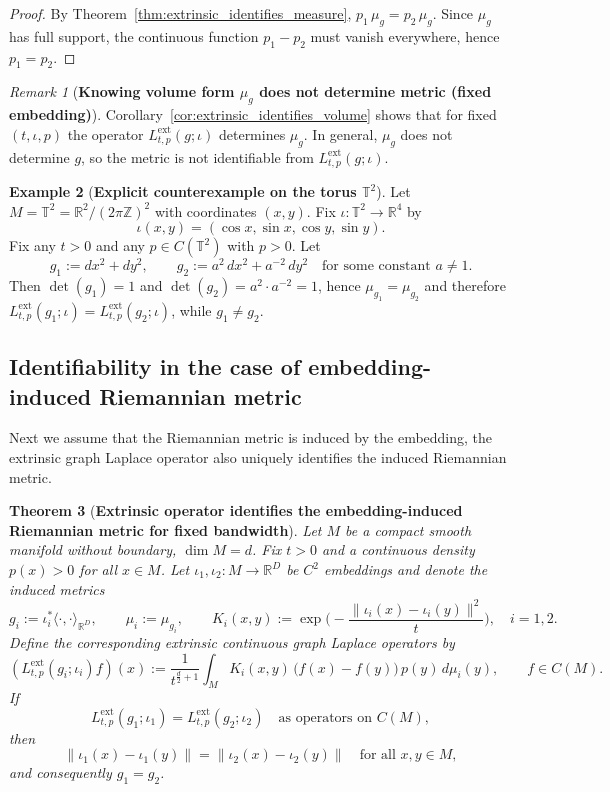 \documentclass{amsart}
\newtheorem{theorem}{Theorem}[section]
\theoremstyle{definition}
\newtheorem{example}[theorem]{Example}
\theoremstyle{remark}
\newtheorem{remark}[theorem]{Remark}
\newcommand{\nd}{\noindent}
\newcommand{\Ddim}{\mathbb{R}^D}
\newcommand{\0}{\boldsymbol{0}}
\begin{document}
\begin{proof}
By Theorem~\ref{thm:extrinsic_identifies_measure}, $p_1\,\mu_g=p_2\,\mu_g$.
Since $\mu_g$ has full support, the continuous function $p_1-p_2$ must vanish everywhere, hence $p_1=p_2$.
\end{proof}


\begin{remark}[\textbf{Knowing volume form $\mu_g$ does not determine metric (fixed embedding)}]
\label{rem:extrinsic_metric_not_identifiable}
Corollary~\ref{cor:extrinsic_identifies_volume} shows that for fixed $(t,\iota,p)$ the operator
$L^{\mathrm{ext}}_{t,p}(g;\iota)$ determines $\mu_g$. In general, $\mu_g$ does not determine $g$,
so the metric is not identifiable from $L^{\mathrm{ext}}_{t,p}(g;\iota)$.
\end{remark}

\begin{example}[\textbf{Explicit counterexample on the torus $\mathbb{T}^2$}]
\label{ex:torus_volume_same_metric_diff}
Let $M=\mathbb{T}^2=\mathbb{R}^2/(2\pi\mathbb{Z})^2$ with coordinates $(x,y)$.
Fix $\iota:\mathbb{T}^2\to\mathbb{R}^4$ by
\[
\iota(x,y)=(\cos x,\sin x,\cos y,\sin y).
\]
Fix any $t>0$ and any $p\in C(\mathbb{T}^2)$ with $p>0$.
Let
\[
g_1:=dx^2+dy^2,
\qquad
g_2:=a^2\,dx^2+a^{-2}\,dy^2\quad\text{for some constant }a\neq 1.
\]
Then $\det(g_1)=1$ and $\det(g_2)=a^2\cdot a^{-2}=1$, hence $\mu_{g_1}=\mu_{g_2}$ and therefore
$L^{\mathrm{ext}}_{t,p}(g_1;\iota)=L^{\mathrm{ext}}_{t,p}(g_2;\iota)$, while $g_1\neq g_2$.
\end{example}

\subsection{Identifiability in the case of embedding-induced Riemannian metric}
\nd Next we assume that the Riemannian metric is induced by the embedding, the extrinsic graph Laplace operator also uniquely identifies the induced Riemannian metric. 
\begin{theorem}[\textbf{Extrinsic operator identifies the embedding-induced Riemannian metric for fixed bandwidth}]
\label{thm:extrinsic_induced_metric_identifiable}
Let $M$ be a compact smooth manifold without boundary, $\dim M=d$.
Fix $t>0$ and a continuous density $p(x)>0$ for all $x\in M$.
Let $\iota_1,\iota_2:M\to {\Ddim}$ be $C^2$ embeddings and denote the induced metrics
\[
g_i:=\iota_i^*\langle\cdot,\cdot\rangle_{{\Ddim}},
\qquad \mu_i:=\mu_{g_i},
\qquad 
K_i(x,y):=\exp\!\Big(-\frac{\|\iota_i(x)-\iota_i(y)\|^2}{t}\Big),
\quad i=1,2.
\]
Define the corresponding extrinsic continuous graph Laplace operators by
\[
(L^{\mathrm{ext}}_{t,p}(g_i;\iota_i)f)(x)
:=\frac{1}{t^{\frac d2+1}}
\int_M K_i(x,y)\,\bigl(f(x)-f(y)\bigr)\,p(y)\,d\mu_i(y),
\qquad f\in C(M).
\]
If
\[
L^{\mathrm{ext}}_{t,p}(g_1;\iota_1)=L^{\mathrm{ext}}_{t,p}(g_2;\iota_2)
\quad\text{as operators on }C(M),
\]
then
\[
\|\iota_1(x)-\iota_1(y)\|
=\|\iota_2(x)-\iota_2(y)\|
\quad\text{for all }x,y\in M,
\]
and consequently $g_1=g_2$.
\end{theorem}
\end{document}
